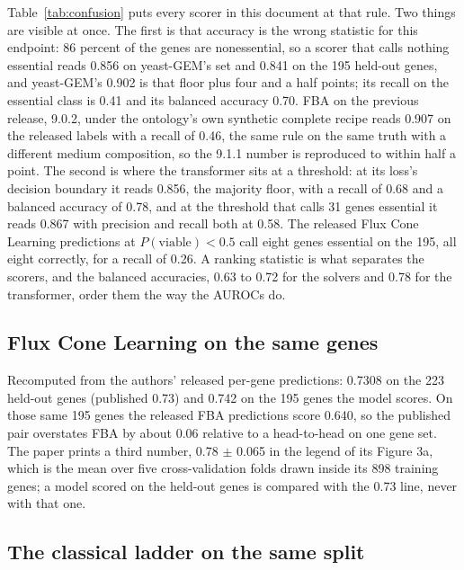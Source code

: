 Table~\ref{tab:confusion} puts every scorer in this document at that rule. Two things
are visible at once. The first is that accuracy is the wrong statistic for this
endpoint: 86 percent of the genes are nonessential, so a scorer that calls nothing
essential reads 0.856 on yeast-GEM's set and 0.841 on the 195 held-out genes, and
yeast-GEM's 0.902 is that floor plus four and a half points; its recall on the
essential class is 0.41 and its balanced accuracy 0.70. FBA on the previous release, 9.0.2, under the ontology's own synthetic complete
recipe reads 0.907 on the released labels with a recall of 0.46, the same rule on the
same truth with a different medium composition, so the 9.1.1 number is reproduced to
within half a point. The second is where the transformer sits at a threshold: at its loss's
decision boundary it reads 0.856, the majority floor, with a recall of 0.68 and a
balanced accuracy of 0.78, and at the threshold that calls 31 genes essential it reads
0.867 with precision and recall both at 0.58. The released Flux Cone Learning
predictions at $P(\text{viable}) < 0.5$ call eight genes essential on the 195, all eight
correctly, for a recall of 0.26. A ranking statistic is what separates the scorers, and
the balanced accuracies, 0.63 to 0.72 for the solvers and 0.78 for the transformer,
order them the way the AUROCs do.



\subsection{Flux Cone Learning on the same genes}

Recomputed from the authors' released per-gene predictions: 0.7308 on the 223 held-out
genes (published 0.73) and 0.742 on the 195 genes the model scores. On those same 195 genes
the released FBA predictions score 0.640, so the published pair overstates FBA by about
0.06 relative to a head-to-head on one gene set. The paper prints a third number, 0.78
$\pm$ 0.065 in the legend of its Figure 3a, which is the mean over five cross-validation
folds drawn inside its 898 training genes; a model scored on the held-out genes is compared
with the 0.73 line, never with that one.

\subsection{The classical ladder on the same split}

